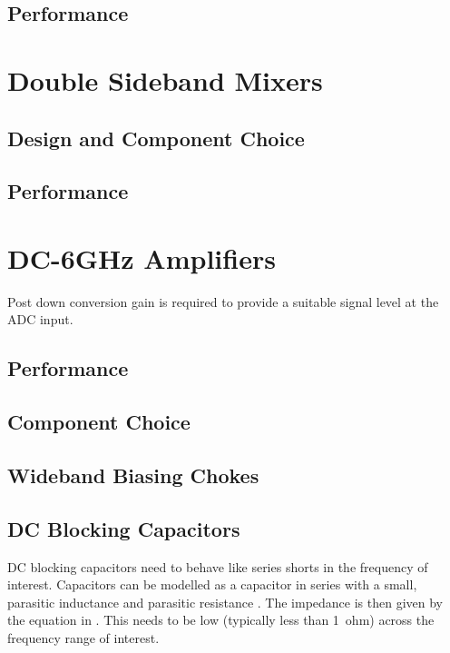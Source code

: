  

  \subsection{Performance}



\section{Double Sideband Mixers}

  \subsection{Design and Component Choice}

  \subsection{Performance}


\section{DC-6GHz Amplifiers}
Post down conversion gain is required to provide a suitable signal level at the ADC input. 


  \subsection{Performance}

  \subsection{Component Choice}

 \subsection{Wideband Biasing Chokes}

 \subsection{DC Blocking Capacitors}
DC blocking capacitors need to behave like series shorts in the frequency of interest. Capacitors can be modelled as a capacitor in series with a small, parasitic inductance and parasitic resistance \cite{Urs2011,broadbandCaps,Cain2010}. The impedance is then given by the equation in . This needs to be low (typically less than 1~ohm) across the frequency range of interest.


